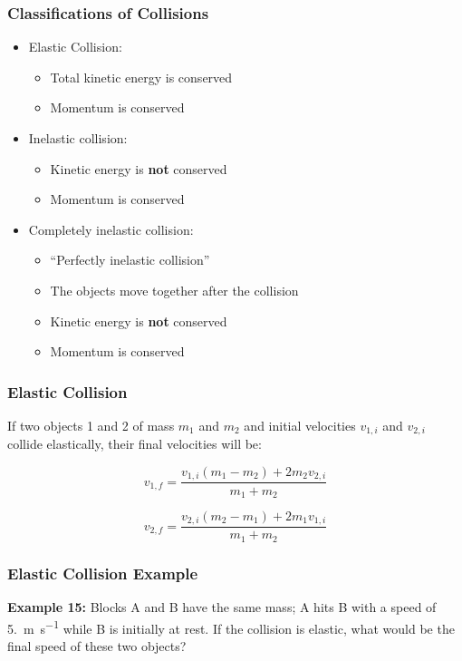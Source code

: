 \documentclass[12pt,compress,aspectratio=169]{beamer}
\begin{document}
\begin{frame}
  \frametitle{Classifications of Collisions}
  \begin{itemize}
  \item Elastic Collision:
    \begin{itemize}
    \item Total kinetic energy is conserved
    \item Momentum is conserved
    \end{itemize}
  \item Inelastic collision:
    \begin{itemize}
    \item Kinetic energy is \textbf{not} conserved
    \item Momentum is conserved
    \end{itemize}
  \item Completely inelastic collision:
    \begin{itemize}
    \item ``Perfectly inelastic collision''
    \item The objects move together after the collision
    \item Kinetic energy is \textbf{not} conserved
    \item Momentum is conserved
    \end{itemize}
  \end{itemize}
\end{frame}

\begin{frame}
  \frametitle{Elastic Collision}
  If two objects 1 and 2 of mass $m_1$ and $m_2$ and initial velocities
  $v_{1,i}$ and $v_{2,i}$ collide elastically, their final velocities will be:
  
  {\Large
    \begin{displaymath}
      v_{1,f}=\frac{v_{1,i}(m_1-m_2)+2m_2v_{2,i}}{m_1+m_2}
    \end{displaymath}
    
    \begin{displaymath}
      v_{2,f}=\frac{v_{2,i}(m_2-m_1)+2m_1v_{1,i}}{m_1+m_2}
    \end{displaymath}
  }
\end{frame}

\begin{frame}
  \frametitle{Elastic Collision Example}

  \textbf{Example 15:} Blocks A and B have the same mass; A hits B with a speed
  of \SI{5.}{\metre\per\second} while B is initially at rest. If the collision
  is elastic, what would be the final speed of these two objects?
\end{frame}
\end{document}
